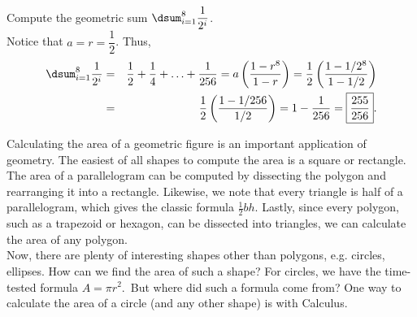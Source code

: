 \documentclass{book}
\begin{document}
\begin{Exam} Compute the geometric sum $\dsum_{i=1}^8\dfrac{1}{2^i}$.\\

Notice that $a = r = \dfrac{1}{2}$. Thus, 
\begin{eqnarray*}
\dsum_{i=1}^8\dfrac{1}{2^i} &=& \frac{1}{2} + \frac{1}{4} + \ldots + \frac{1}{256} = a\left(\dfrac{1-r^8}{1-r}\right) = \dfrac{1}{2}\left(\dfrac{1- 1/2^8}{1-1/2}\right)\\
&=& \dfrac{1}{2}\left(\dfrac{1- 1/256}{1/2}\right) = 1-\dfrac{1}{256} = \fbox{$\dfrac{255}{256}$}. 
\end{eqnarray*}
\end{Exam}\vs

Calculating the area of a geometric figure is an important application of geometry. The easiest of all shapes to compute the area is a square or rectangle. The area of a parallelogram can be computed by dissecting the polygon and rearranging it into a rectangle. Likewise, we note that every triangle is half of a parallelogram, which gives the classic formula $\frac{1}{2}bh$. Lastly, since every polygon, such as a trapezoid or hexagon, can be dissected into triangles, we can calculate the area of any polygon.\\

Now, there are plenty of interesting shapes other than polygons, e.g. circles, ellipses. How can we find the area of such a shape? For circles, we have the time-tested formula $A = \pi r^2$.\footnotemark\ But where did such a formula come from? One way to calculate the area of a circle (and any other shape) is with Calculus.
\end{document}
